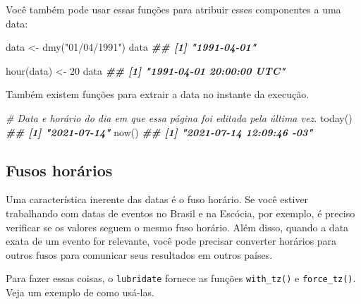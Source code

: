 \documentclass[
]{book}
\newenvironment{Shaded}{\begin{snugshade}}{\end{snugshade}}
\newcommand{\CommentTok}[1]{\textcolor[rgb]{0.56,0.35,0.01}{\textit{#1}}}
\newcommand{\DecValTok}[1]{\textcolor[rgb]{0.00,0.00,0.81}{#1}}
\newcommand{\DocumentationTok}[1]{\textcolor[rgb]{0.56,0.35,0.01}{\textbf{\textit{#1}}}}
\newcommand{\FunctionTok}[1]{\textcolor[rgb]{0.00,0.00,0.00}{#1}}
\newcommand{\NormalTok}[1]{#1}
\newcommand{\OtherTok}[1]{\textcolor[rgb]{0.56,0.35,0.01}{#1}}
\newcommand{\StringTok}[1]{\textcolor[rgb]{0.31,0.60,0.02}{#1}}
\begin{document}
Você também pode usar essas funções para atribuir esses componentes a uma data:

\begin{Shaded}
\begin{Highlighting}[]
\NormalTok{data }\OtherTok{\textless{}{-}} \FunctionTok{dmy}\NormalTok{(}\StringTok{"01/04/1991"}\NormalTok{)}
\NormalTok{data}
\DocumentationTok{\#\# [1] "1991{-}04{-}01"}

\FunctionTok{hour}\NormalTok{(data) }\OtherTok{\textless{}{-}} \DecValTok{20}
\NormalTok{data}
\DocumentationTok{\#\# [1] "1991{-}04{-}01 20:00:00 UTC"}
\end{Highlighting}
\end{Shaded}

Também existem funções para extrair a data no instante da execução.

\begin{Shaded}
\begin{Highlighting}[]
\CommentTok{\# Data e horário do dia em que essa página foi editada pela última vez.}
\FunctionTok{today}\NormalTok{() }
\DocumentationTok{\#\# [1] "2021{-}07{-}14"}
\FunctionTok{now}\NormalTok{()}
\DocumentationTok{\#\# [1] "2021{-}07{-}14 12:09:46 {-}03"}
\end{Highlighting}
\end{Shaded}

\hypertarget{fusos-horuxe1rios}{%
\subsection{Fusos horários}\label{fusos-horuxe1rios}}

Uma característica inerente das datas é o fuso horário. Se você estiver trabalhando com datas de eventos no Brasil e na Escócia, por exemplo, é preciso verificar se os valores seguem o mesmo fuso horário. Além disso, quando a data exata de um evento for relevante, você pode precisar converter horários para outros fusos para comunicar seus resultados em outros países.

Para fazer essas coisas, o \texttt{lubridate} fornece as funções \texttt{with\_tz()} e \texttt{force\_tz()}. Veja um exemplo de como usá-las.
\end{document}
